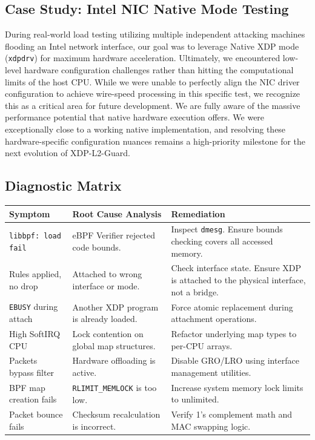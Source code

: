 \documentclass[11pt,a4paper]{article}
\begin{document}
\subsection{Case Study: Intel NIC Native Mode Testing}
During real-world load testing utilizing multiple independent attacking machines flooding an Intel network interface, our goal was to leverage Native XDP mode (\texttt{xdpdrv}) for maximum hardware acceleration.
Ultimately, we encountered low-level hardware configuration challenges rather than hitting the computational limits of the host CPU.
While we were unable to perfectly align the NIC driver configuration to achieve wire-speed processing in this specific test, we recognize this as a critical area for future development.
We are fully aware of the massive performance potential that native hardware execution offers.
We were exceptionally close to a working native implementation, and resolving these hardware-specific configuration nuances remains a high-priority milestone for the next evolution of XDP-L2-Guard.

\subsection{Diagnostic Matrix}

\begin{center}
\renewcommand{\arraystretch}{1.5} 
\begin{tabular}{|p{}|p{}|p{}|}
\hline
\textbf{Symptom} & \textbf{Root Cause Analysis} & \textbf{Remediation} \\ \hline
\texttt{libbpf: load fail} & eBPF Verifier rejected code bounds. & Inspect \texttt{dmesg}. Ensure bounds checking covers all accessed memory. \\ \hline
Rules applied, no drop & Attached to wrong interface or mode. & Check interface state. Ensure XDP is attached to the physical interface, not a bridge. \\ \hline
\texttt{EBUSY} during attach & Another XDP program is already loaded. & Force atomic replacement during attachment operations. \\ \hline
High SoftIRQ CPU & Lock contention on global map structures. & Refactor underlying map types to per-CPU arrays. \\ \hline
Packets bypass filter & Hardware offloading is active. & Disable GRO/LRO using interface management utilities. \\ \hline
BPF map creation fails & \texttt{RLIMIT\_MEMLOCK} is too low. & Increase system memory lock limits to unlimited. \\ \hline
Packet bounce fails & Checksum recalculation is incorrect. & Verify 1's complement math and MAC swapping logic. \\ \hline
\end{tabular}
\end{center}
\end{document}
